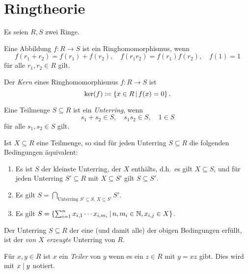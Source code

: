 \chapter{Ringtheorie}

Es seien $R, S$ zwei Ringe.

\begin{definition}
  Eine Abbildung $f \colon R \to S$ ist ein Ringhomomorphismus, wenn
  \[
      f(r_1 + r_2)
    = f(r_1) + f(r_2),
    \quad
      f(r_1 r_2)
    = f(r_1) f(r_2),
    \quad
      f(1) = 1
  \]
  für alle $r_1, r_2 \in R$ gilt.
\end{definition}

\begin{definition}
  Der \emph{Kern} eines Ringhomomorphismus $f \colon R \to S$ ist
  \[
              \ker(f)
    \defined  \{ x \in R \suchthat f(x) = 0 \} \,.
  \]
\end{definition}

\begin{definition}
  Eine Teilmenge $S \subseteq R$ ist ein \emph{Unterring}, wenn
  \[
    s_1 + s_2 \in S,
    \quad
    s_1 s_2 \in S,
    \quad
    1 \in S
  \]
  für alle $s_1, s_2 \in S$ gilt.
\end{definition}

Ist $X \subseteq R$ eine Teilmenge, so sind für jeden Unterring $S \subseteq R$ die folgenden Bedingungen äquivalent:

\begin{enumerate}
  \item
    Es ist $S$ der kleinste Unterring, der $X$ enthälts, d.h.\ es gilt $X \subseteq S$, und für jeden Unterring $S' \subseteq R$ mit $X \subseteq S'$ gilt $S \subseteq S'$.
  \item
    Es gilt $S = \bigcap_{\text{Unterring $S' \subseteq S$, $X \subseteq S'$}} S'$.
  \item
    Es gilt $S = \{ \sum_{i=1}^n x_{i,1} \dotsm x_{i,m_i} \suchthat n, m_i \in \Natural, x_{i,j} \in X \}$.
\end{enumerate}

\begin{definition}
  Der Unterring $S \subseteq R$ der eine \textup(und damit alle\textup) der obigen Bedingungen erfüllt, ist der \emph{von $X$ erzeugte} Unterring von $R$.
\end{definition}


\begin{definition}
  Für $x, y \in R$ ist $x$ ein \emph{Teiler} von $y$ wenn es ein $z \in R$ mit $y = xz$ gibt.
  Dies wird mit $x \mathrel{|} y$ notiert.
\end{definition}





